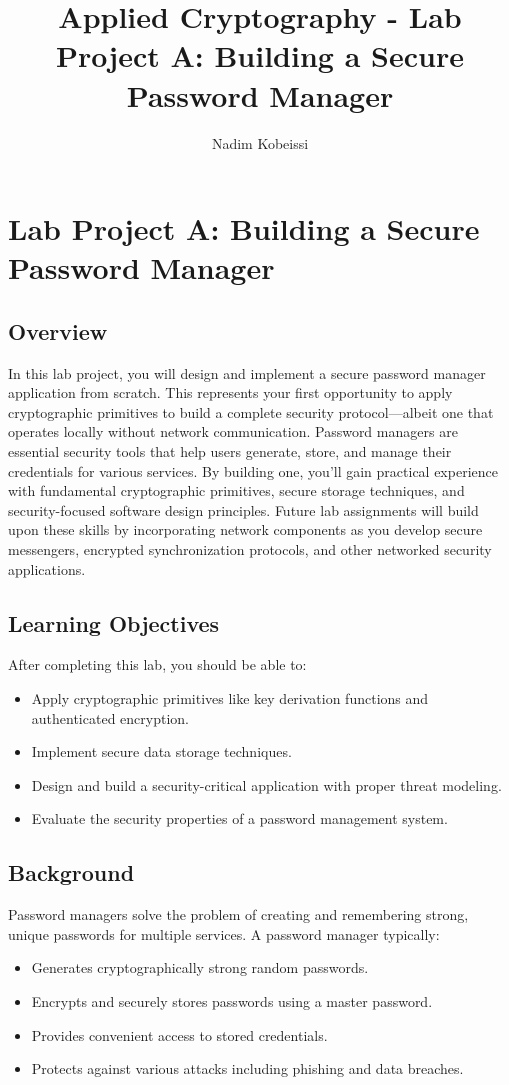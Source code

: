 \documentclass[10pt,a4paper,american]{article}
\title{Applied Cryptography - Lab Project A: Building a Secure Password Manager}
\author{Nadim Kobeissi}
\begin{document}
\classhandoutheader
\section*{Lab Project A: Building a Secure Password Manager}

\subsection*{Overview}
In this lab project, you will design and implement a secure password manager application from scratch. This represents your first opportunity to apply cryptographic primitives to build a complete security protocol—albeit one that operates locally without network communication. Password managers are essential security tools that help users generate, store, and manage their credentials for various services. By building one, you'll gain practical experience with fundamental cryptographic primitives, secure storage techniques, and security-focused software design principles. Future lab assignments will build upon these skills by incorporating network components as you develop secure messengers, encrypted synchronization protocols, and other networked security applications.

\subsection*{Learning Objectives}
After completing this lab, you should be able to:
\begin{itemize}
	\item Apply cryptographic primitives like key derivation functions and authenticated encryption.
	\item Implement secure data storage techniques.
	\item Design and build a security-critical application with proper threat modeling.
	\item Evaluate the security properties of a password management system.
\end{itemize}

\subsection*{Background}
Password managers solve the problem of creating and remembering strong, unique passwords for multiple services. A password manager typically:
\begin{itemize}
	\item Generates cryptographically strong random passwords.
	\item Encrypts and securely stores passwords using a master password.
	\item Provides convenient access to stored credentials.
	\item Protects against various attacks including phishing and data breaches.
\end{itemize}
\end{document}
